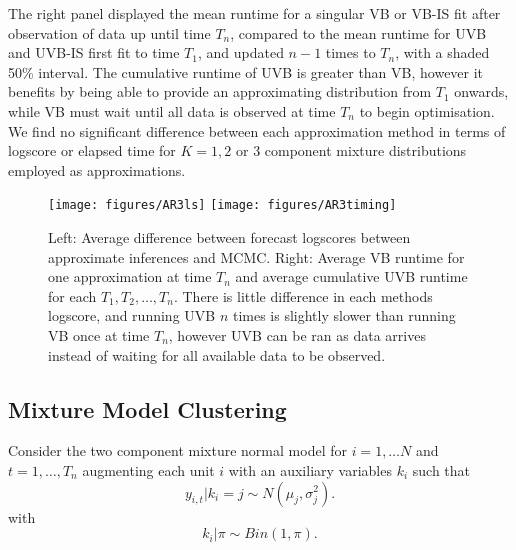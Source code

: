 \documentclass[12pt,a4paper]{article}\usepackage[]{graphicx}\usepackage[]{color}
\begin{document}
The right panel displayed the mean runtime for a singular VB or VB-IS fit after observation of data up until time $T_n$, compared to the mean runtime for UVB and UVB-IS first fit to time $T_1$, and updated $n-1$ times to $T_n$, with a shaded 50\% interval. The cumulative runtime of UVB is greater than VB, however it benefits by being able to provide an approximating distribution from $T_1$ onwards, while VB must wait until all data is observed at time $T_n$ to begin optimisation. We find no significant difference between each approximation method in terms of logscore or elapsed time for $K = 1, 2 $ or $3$ component mixture distributions employed as approximations.   

\begin{figure}%
    \centering
    {{\texttt{[image: figures/AR3ls]} }}%
    \qquad
    {{\texttt{[image: figures/AR3timing]} }}%
    \caption{Left: Average difference between forecast logscores between approximate inferences and MCMC. Right: Average VB runtime for one approximation at time $T_n$ and average cumulative UVB runtime for each $T_1, T_2, \ldots, T_n$. There is little difference in each methods logscore, and running UVB $n$ times is slightly slower than running VB once at time $T_n$, however UVB can be ran as data arrives instead of waiting for all available data to be observed.}%
    \label{fig:UVBAR3Timing}%
\end{figure}

\subsection{Mixture Model Clustering}
\label{subsec:UVBMMC}

Consider the two component mixture normal model for $i = 1, \ldots N$ and $t = 1, \ldots, T_n$  augmenting each unit $i$ with an auxiliary variables $k_i$ such that
\begin{equation}
\label{UVB:MMCmixNormalDGP2}
y_{i, t} | k_i = j \sim  N(\mu_j, \sigma^2_{j}).
\end{equation}
with 
\begin{equation}
\label{UVB:MMCkPrior}
k_i | \pi \sim Bin(1, \pi).
\end{equation}
\end{document}
